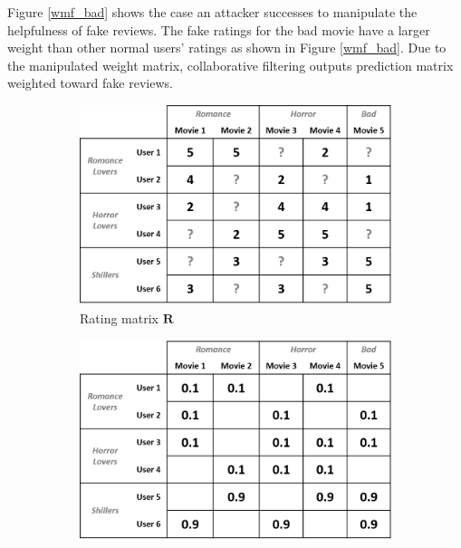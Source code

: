 \documentclass[master,english,final]{kaist-ucs}
\begin{document}
Figure \ref{wmf_bad} shows the case an attacker successes to manipulate the helpfulness of fake reviews.
The fake ratings for the bad movie have a larger weight than other normal users' ratings as shown in Figure \ref{wmf_bad}.
Due to the manipulated weight matrix, collaborative filtering outputs prediction matrix weighted toward fake reviews.


\begin{figure}[h]
    \centering
    \begin{subfigure}[b]{0.3\textwidth}
        \centering
        \includegraphics[width=\textwidth]{figure/mf_after_rating}
        \caption{Rating matrix $\bm{R}$}
    \end{subfigure}
    \begin{subfigure}[b]{0.3\textwidth}
        \centering
        \includegraphics[width=\textwidth]{figure/wmf_bad_weight}

\end{subfigure}
\end{figure}
\end{document}
